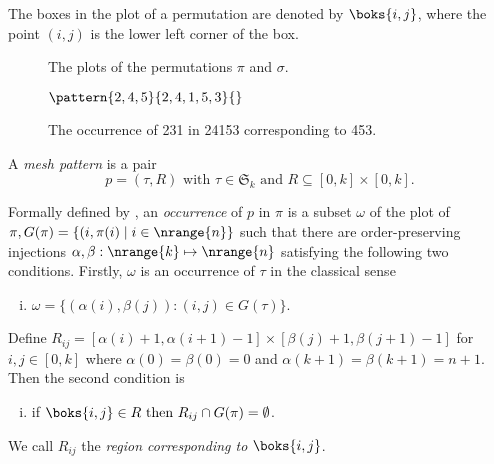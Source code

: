 The boxes in the plot of a permutation are denoted by \(\boks{i,j}\), where the
point \((i,j)\) is the lower left corner of the box.

\begin{figure}[htb]
    \begin{center}
    \raisebox{6ex}{\(G(\pi)=\)}

        \caption{The plots of the permutations \(\pi\) and \(\sigma\).}
        \label{fig:plots}
    \end{center}
\end{figure}

\begin{figure}[htb]
    \begin{center}
    \(\pattern{2,4,5}{2,4,1,5,3}{}\)
        \caption{The occurrence of 231 in 24153 corresponding to 453.}
        \label{fig:containment}
    \end{center}
\end{figure}

\begin{definition}
A \emph{mesh pattern} is a pair
\begin{equation*}
    p = (\tau,R)\text{ with } \tau \in \mathfrak{S}_k \text{ and } R \subseteq [0,k]\times [0,k].
\end{equation*}
\end{definition}

Formally defined by \textcite{journals/combinatorics/BrandenC11}, an
\emph{occurrence} of \(p\) in \(\pi\) is a subset \(\omega\) of the plot of
\(\pi, G(\pi) = \{(i,\pi(i)\mid i\in\nrange{n}\}\) such that there are
order-preserving injections \(\alpha,\beta:\nrange{k}\mapsto\nrange{n}\)
satisfying the following two conditions.
Firstly, \(\omega\) is an occurrence of \(\tau\) in the classical sense
  \begin{enumerate}[i.]
    \item \(\omega = \{(\alpha(i),\beta(j)):(i,j)\in G(\tau)\}\).
  \end{enumerate}\saveenum
  Define \(R_{ij} = [\alpha(i)+1,\alpha(i+1)-1]\times[\beta(j)+1,\beta(j+1)-1]\)
   for \(i,j\in[0,k]\) where \(\alpha(0)=\beta(0)=0\) and \(\alpha(k+1)=\beta(k+1)=n+1\). Then
   the second condition is
  \begin{enumerate}[i.]\resetenum
  \item if \(\boks{i,j} \in R \text{ then } R_{ij} \cap G(\pi) = \emptyset\).
\end{enumerate}
We call \(R_{ij}\) the \emph{region corresponding to} \(\boks{i,j}\).

